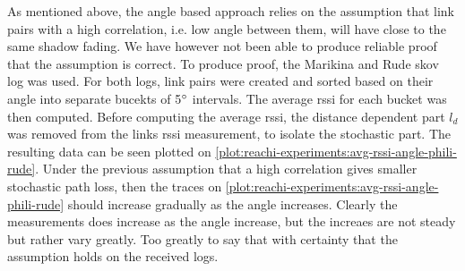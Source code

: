 As mentioned above, the angle based approach relies on the assumption that link pairs with a high correlation, i.e. low angle between them, will have close to the same shadow fading. We have however not been able to produce reliable proof that the assumption is correct. To produce proof, the Marikina and Rude skov log was used. For both logs, link pairs were created and sorted based on their angle into separate bucekts of 5$\degree$ intervals. The average \gls{rssi} for each bucket was then computed. Before computing the average \gls{rssi}, the distance dependent part $l_d$ was removed from the links \gls{rssi} measurement, to isolate the stochastic part. The resulting data can be seen plotted on \autoref{plot:reachi-experiments:avg-rssi-angle-phili-rude}. Under the previous assumption that a high correlation gives smaller stochastic path loss, then the traces on \autoref{plot:reachi-experiments:avg-rssi-angle-phili-rude} should increase gradually as the angle increases. Clearly the measurements does increase as the angle increase, but the increaes are not steady but rather vary greatly. Too greatly to say that with certainty that the assumption holds on the received logs.

